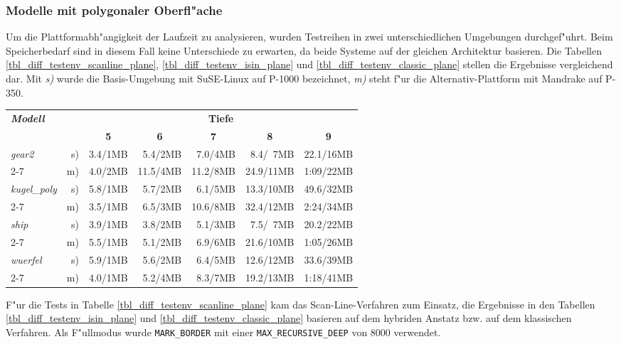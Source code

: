 \subsubsection{Modelle mit polygonaler Oberfl"ache}

Um die Plattformabh"angigkeit der Laufzeit zu analysieren, wurden 
Testreihen in zwei unterschiedlichen Umgebungen durchgef"uhrt. 
Beim Speicherbedarf sind in diesem Fall keine Unterschiede zu erwarten, da 
beide Systeme auf der gleichen Architektur basieren. 
Die Tabellen \ref{tbl_diff_testenv_scanline_plane}, 
\ref{tbl_diff_testenv_isin_plane} und \ref{tbl_diff_testenv_classic_plane} 
stellen die Ergebnisse vergleichend dar. Mit \emph{s)} wurde die 
Basis-Umgebung mit SuSE-Linux auf P-1000 bezeichnet, \emph{m)} steht f"ur die 
Alternativ-Plattform mit Mandrake auf P-350. 

\tabbeg
\newcommand*\myhline{\hline\hline}
\newcommand*\myitema[6]{\emph{#1} & s) & #2 & #3 & #4 & #5 & #6 \\\cline{2-7}}
\newcommand*\myitemb[5]{          & m) & #1 & #2 & #3 & #4 & #5 \\}
\begin{tabular}{|lr|r|r|r|r|r|}
\hline
\textbf{\emph{Modell}} & & \multicolumn{5}{c|}{\textbf{Tiefe}} \\
  & & \multicolumn{1}{c|}{\textbf{5}} & \multicolumn{1}{c|}{\textbf{6}}
    & \multicolumn{1}{c|}{\textbf{7}} & \multicolumn{1}{c|}{\textbf{8}} 
    & \multicolumn{1}{c|}{\textbf{9}} \\
\hline\hline
\myitema{gear2}{      3.4/1MB}{~5.4/2MB}{~7.0/4MB}{~8.4/~7MB}{22.1/16MB}
\myitemb{             4.0/2MB}{11.5/4MB}{11.2/8MB}{24.9/11MB}{1:09/22MB}
\myhline
\myitema{kugel\_poly}{5.8/1MB}{~5.7/2MB}{~6.1/5MB}{13.3/10MB}{49.6/32MB}
\myitemb{             3.5/1MB}{~6.5/3MB}{10.6/8MB}{32.4/12MB}{2:24/34MB}
\myhline
\myitema{ship}{       3.9/1MB}{~3.8/2MB}{~5.1/3MB}{~7.5/~7MB}{20.2/22MB}
\myitemb{             5.5/1MB}{~5.1/2MB}{~6.9/6MB}{21.6/10MB}{1:05/26MB}
\myhline
\myitema{wuerfel}{    5.9/1MB}{~5.6/2MB}{~6.4/5MB}{12.6/12MB}{33.6/39MB}
\myitemb{             4.0/1MB}{~5.2/4MB}{~8.3/7MB}{19.2/13MB}{1:18/41MB}
\hline
\end{tabular}

F"ur die Tests in Tabelle \ref{tbl_diff_testenv_scanline_plane} kam das 
Scan-Line-Verfahren zum Einsatz, die Ergebnisse in den Tabellen 
\ref{tbl_diff_testenv_isin_plane} und \ref{tbl_diff_testenv_classic_plane} 
basieren auf dem hybriden Anstatz bzw. auf dem klassischen Verfahren. 
Als F"ullmodus wurde \texttt{MARK\_BORDER} mit einer 
\texttt{MAX\_RECURSIVE\_DEEP} von $8000$ verwendet. 

